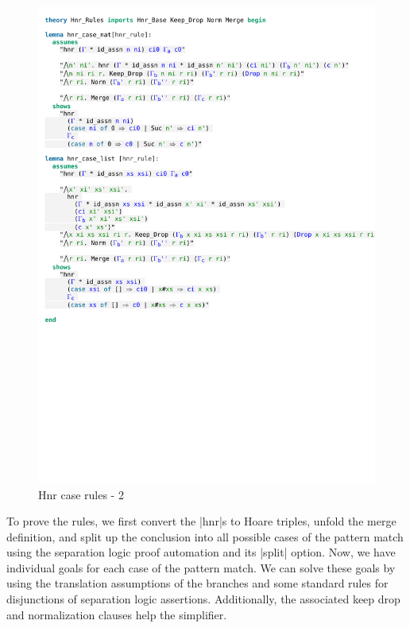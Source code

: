 \begin{figure}[htpb]
    \includegraphics[trim={0 10,8cm 0 1,6cm}, clip, width=1.00\textwidth]{figures/Theory_Hnr_Rules_Case_2.pdf}
    \caption[Hnr case rules - 2]{Hnr case rules - 2}
    \label{fig:hnr_case_2}
\end{figure}

\noindent To prove the rules, we first convert the |hnr|s to Hoare triples, unfold the merge definition, and split up the conclusion into all possible cases of the pattern match using the separation logic proof automation and its |split| option. Now, we have individual goals for each case of the pattern match. We can solve these goals by using the translation assumptions of the branches and some standard rules for disjunctions of separation logic assertions. Additionally, the associated keep drop and normalization clauses help the simplifier.

